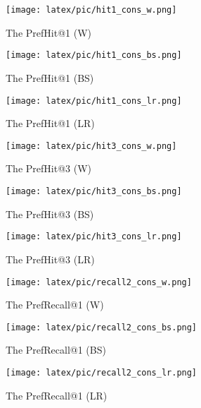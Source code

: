 \begin{figure*}[h]
  \centering

  \begin{subfigure}{0.3\linewidth}
    \texttt{[image: latex/pic/hit1\_cons\_w.png]}
    \caption{The PrefHit@1 (W)}
    \label{fig::hit1_cons_w}
  \end{subfigure}
  \begin{subfigure}{0.3\linewidth}
    \texttt{[image: latex/pic/hit1\_cons\_bs.png]}
    \caption{The PrefHit@1 (BS)}
    \label{fig::hit1_cons_bs}
  \end{subfigure}
  \begin{subfigure}{0.3\linewidth}
    \texttt{[image: latex/pic/hit1\_cons\_lr.png]}
    \caption{The PrefHit@1 (LR)}
    \label{fig::hit1_cons_lr}
  \end{subfigure}

  \medskip

  \begin{subfigure}{0.3\linewidth}
    \texttt{[image: latex/pic/hit3\_cons\_w.png]}
    \caption{The PrefHit@3 (W)}
    \label{fig::hit3_cons_w}
  \end{subfigure}
  \begin{subfigure}{0.3\linewidth}
    \texttt{[image: latex/pic/hit3\_cons\_bs.png]}
    \caption{The PrefHit@3 (BS)}
    \label{fig::hit3_cons_bs}
  \end{subfigure}
  \begin{subfigure}{0.3\linewidth}
    \texttt{[image: latex/pic/hit3\_cons\_lr.png]}
    \caption{The PrefHit@3 (LR)}
    \label{fig::hit3_cons_lr}
  \end{subfigure}

  \medskip

  \begin{subfigure}{0.3\linewidth}
    \texttt{[image: latex/pic/recall2\_cons\_w.png]}
    \caption{The PrefRecall@1 (W)}
    \label{fig::recall2_cons_w}
  \end{subfigure}
  \begin{subfigure}{0.3\linewidth}
    \texttt{[image: latex/pic/recall2\_cons\_bs.png]}
    \caption{The PrefRecall@1 (BS)}
    \label{fig::recall2_cons_bs}
  \end{subfigure}
  \begin{subfigure}{0.3\linewidth}
    \texttt{[image: latex/pic/recall2\_cons\_lr.png]}
    \caption{The PrefRecall@1 (LR)}
    \label{fig::recall2_cons_lr}
  \end{subfigure}


\end{figure*}
